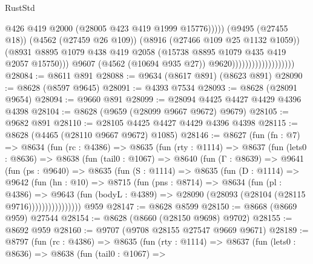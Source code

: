 \begin{lexlean}{RustStd}
\begin{coremodule}
                                                    @426
                                                    @419
                                                    @2000
                                                    (@28005 @423 @419 @1999 @15776)))))
                                            (@9495 (@27455 @18))
                                            (@4562 (@27459 @26 @109))
                                            (@8916 (@27466 @109 @25 @1132 @1059))
                                            (@8931
                                              @8895
                                              @1079
                                              @438
                                              @419
                                              @2058
                                              (@15738 @8895 @1079 @435 @419 @2057 @15750)))
                                          @9607
                                          (@4562 (@10694 @935 @27))
                                          @9620)))))))))))))))))))
@28084 := @8611 @891
@28088 := @9634 (@8617 @891) (@8623 @891)
@28090 := @8628 (@8597 @9645)
@28091 := @4393 @7534
@28093 := @8628 (@28091 @9654)
@28094 := @9660 @891
@28099 := @28094 @4425 @4427 @4429 @4396 @4398
@28104 := @8628 (@9659 (@28099 @9667 @9672) @9679)
@28105 := @9682 @891
@28110 := @28105 @4425 @4427 @4429 @4396 @4398
@28115 := @8628 (@4465 (@28110 @9667 @9672) @1085)
@28146 := @8627
    (fun (fn : @7) =>
    @8634
      (fun (rc : @4386) =>
      @8635
        (fun (rty : @1114) =>
        @8637
          (fun (lets0 : @8636) =>
          @8638
            (fun (tail0 : @1067) =>
            @8640
              (fun (Γ : @8639) =>
              @9641
                (fun (ps : @9640) =>
                @8635
                  (fun (S : @1114) =>
                  @8635
                    (fun (D : @1114) =>
                    @9642
                      (fun (hn : @10) =>
                      @8715
                        (fun (pns : @8714) =>
                        @8634
                          (fun (pl : @4386) =>
                          @9643
                            (fun (bodyL : @4389) =>
                            @28090 (@28093 (@28104 (@28115 @9716))))))))))))))))
    @959
@28147 := @8628 @8599
@28150 := @8668 (@8669 @959) @27544
@28154 := @8628 (@8660 (@28150 @9698) @9702)
@28155 := @8692 @959
@28160 := @9707 (@9708 @28155 @27547 @9669 @9671)
@28189 := @8797
    (fun (rc : @4386) =>
    @8635
      (fun (rty : @1114) =>
      @8637
        (fun (lets0 : @8636) =>
        @8638
          (fun (tail0 : @1067) =>

\end{coremodule}
\end{lexlean}
